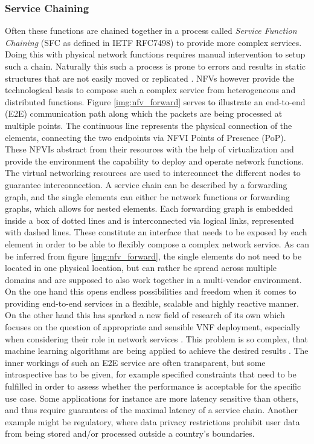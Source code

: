 \subsubsection{Service Chaining}
Often these functions are chained together in a process called \textit{Service Function Chaining} (SFC as defined in IETF RFC7498) to provide more complex services. Doing this with physical network functions requires manual intervention to setup such a chain. Naturally this such a process is prone to errors and results in static structures that are not easily moved or replicated \cite{luizelli2017actual}. NFVs  however provide the technological basis to compose such a complex service from heterogeneous and distributed functions. Figure \ref{img:nfv_forward} serves to illustrate an end-to-end (E2E) communication path along which the packets are being processed at multiple points. The continuous line represents the physical connection of the elements, connecting the two endpoints via NFVI Points of Presence (PoP). These NFVIs abstract from their resources with the help of virtualization and provide the environment the capability to deploy and operate network functions. The virtual networking resources are used to interconnect the different nodes to guarantee interconnection.  A service chain can be described by a forwarding graph, and the single elements can either be network functions or forwarding graphs, which allows for nested elements. Each forwarding graph is embedded inside a box of dotted lines and is interconnected via logical links, represented with dashed lines. These constitute an interface that needs to be exposed by each element in order to be able to flexibly compose a complex network service. As can be inferred from figure \ref{img:nfv_forward}, the single elements do not need to be located in one physical location, but can rather be spread across multiple domains and are supposed to also work together in a multi-vendor environment. On the one hand this opens endless possibilities and freedom when it comes to providing end-to-end services in a flexible, scalable and highly reactive manner. On the other hand this has sparked a new field of research of its own which focuses on the question of appropriate and sensible VNF deployment, especially when considering their role in network services \cite{place1} \cite{place2} \cite{place3}. This problem is so complex, that machine learning algorithms are being applied to achieve the desired results \cite{placeml1} \cite{placeml2}.  The inner workings of such an E2E service are often transparent, but some introspective has to be given, for example specified constraints that need to be fulfilled in order to assess whether the performance is acceptable for the specific use case. Some applications for instance are more latency sensitive than others, and thus require guarantees of the maximal latency of a service chain. Another example might be regulatory, where data privacy restrictions prohibit user data from being stored and/or processed outside a country's boundaries. 

